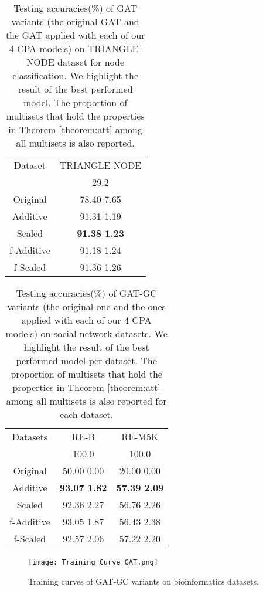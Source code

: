 \documentclass[letterpaper]{article} \usepackage{aaai20}  \usepackage{times}  \usepackage{helvet} \usepackage{courier}  \usepackage[hyphens]{url}  \usepackage{graphicx} \urlstyle{rm} \def\UrlFont{\rm}  \usepackage{graphicx}  \frenchspacing  \setlength{\pdfpagewidth}{8.5in}  \setlength{\pdfpageheight}{11in}
\theoremstyle{plain}
\theoremstyle{definition}
\begin{document}
\begin{table}[t]
\centering
\small
\caption{Testing accuracies(\%) of GAT variants (the original GAT and the GAT applied with each of our 4 CPA models) on TRIANGLE-NODE dataset for node classification. We highlight the result of the best performed model. The proportion  of multisets that hold the properties in Theorem \ref{theorem:att} among all multisets is also reported.} \label{Triangle}
\smallskip
\begin{tabular}{cc}
\toprule
Dataset & {TRIANGLE-NODE}\\
  & 29.2 \\
\midrule
\midrule
{Original}   &  78.40  7.65\\
\midrule
{Additive}   &  91.31  1.19\\
{Scaled}     &  {\bf 91.38  1.23}\\
{f-Additive} &  91.18  1.24\\
{f-Scaled}   &  91.36  1.26\\
\bottomrule
\end{tabular}
\end{table}

\begin{table}[t]
\centering
\small
\caption{Testing accuracies(\%) of GAT-GC variants (the original one and the ones applied with each of our 4 CPA models) on social network datasets. We highlight the result of the best performed model per dataset. The proportion  of multisets that hold the properties in Theorem \ref{theorem:att} among all multisets is also reported for each dataset.} \label{Social}
\smallskip
\begin{tabular}{ccc}
\toprule
Datasets &{RE-B}&{RE-M5K}\\
  & 100.0 &  100.0 \\
\midrule
\midrule
{Original}  & 50.00  0.00   & 20.00  0.00 \\
\midrule
{Additive}  & {\bf 93.07  1.82} & {\bf 57.39  2.09} \\
{Scaled}  &  92.36  2.27  &  56.76  2.26 \\
{f-Additive}  & 93.05  1.87   &  56.43  2.38 \\
{f-Scaled}  &  92.57  2.06 &  57.22  2.20 \\
\bottomrule
\end{tabular}
\end{table}

\begin{figure}[t]
	\centering
	\texttt{[image: Training\_Curve\_GAT.png]}
	\caption{Training curves of GAT-GC variants on bioinformatics datasets.} \label{Training_curve}
\end{figure}
\end{document}
